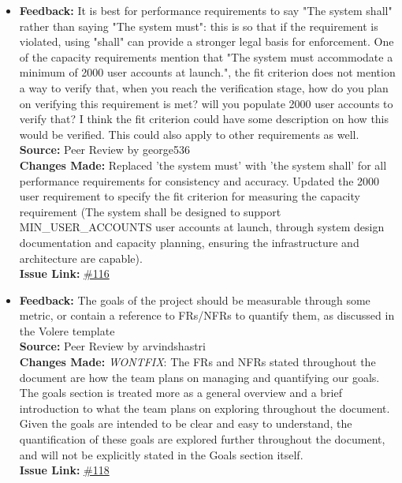 \documentclass{article}
\begin{document}
\begin{itemize}
  \item 
    \textbf{Feedback:} It is best for performance requirements to say "The system shall" rather than saying "The system must": this is so that if the requirement is violated, using "shall" can provide a stronger legal basis for enforcement.
    One of the capacity requirements mention that "The system must accommodate a minimum of 2000 user accounts
    at launch.", the fit criterion does not mention a way to verify that, when you reach the verification stage, how do you plan on verifying this requirement is met? will you populate 2000 user accounts to verify that? I think the fit criterion could have some description on how this would be verified. This could also apply to other requirements as well.\\
    \textbf{Source:} Peer Review by george536\\
    \textbf{Changes Made:} Replaced 'the system must' with 'the system shall' for all performance requirements for consistency and accuracy. Updated the 2000 user requirement to specify the fit criterion for measuring the capacity requirement (The system shall be designed to support MIN\_USER\_ACCOUNTS user accounts at launch, through system design documentation and capacity planning, ensuring the infrastructure and architecture are capable). \\
    \textbf{Issue Link:} \href{https://github.com/parishanizam/TeleHealth/issues/116}{\#116}
  
  \item 
    \textbf{Feedback:} The goals of the project should be measurable through some metric, or contain a reference to FRs/NFRs to quantify them, as discussed in the Volere template \\
    \textbf{Source:} Peer Review by arvindshastri\\
    \textbf{Changes Made:} \textit{WONTFIX}: The FRs and NFRs stated throughout the document are how the team plans on managing and quantifying our goals. The goals section is treated more as a general overview and a brief introduction to what the team plans on exploring throughout the document. Given the goals are intended to be clear and easy to understand, the quantification of these goals are explored further throughout the document, and will not be explicitly stated in the Goals section itself.\\
    \textbf{Issue Link:} \href{https://github.com/parishanizam/TeleHealth/issues/118}{\#118}


\end{itemize}
\end{document}
